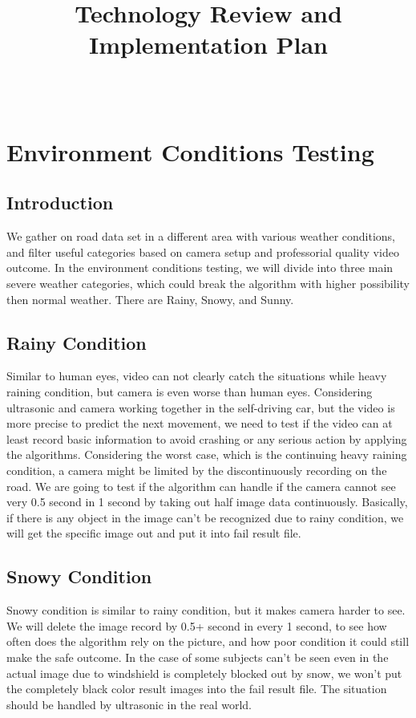\documentclass[10pt,draftclsnofoot,onecolumn,journal,compsoc]{IEEEtran}
\title{Technology Review and Implementation Plan}
\author{
  \IEEEauthorblockN{Team (Group 32) name: Teaching AutoPilot to Dodge\\ Author: Xilun Guo\\Team members: Basil Al Zamil and Tanner Fry} \\
  \IEEEauthorblockA{CS 461: Senior Capstone Fall 2016 \\ Oregon State University}
}
\date{}
\begin{document}
\maketitle
\IEEEdisplaynontitleabstractindextext
\IEEEpeerreviewmaketitle

\newpage

\tableofcontents

\newpage

\section{Environment Conditions Testing}
\subsection{Introduction}
We gather on road data set in a different area with various weather conditions, and filter useful categories based on camera setup and professorial quality video outcome. 
In the environment conditions testing, we will divide into three main severe weather categories, which could break the algorithm with higher possibility then normal weather. 
There are Rainy, Snowy, and Sunny.

\subsection{Rainy Condition}
Similar to human eyes, video can not clearly catch the situations while heavy raining condition, but camera is even worse than human eyes. 
Considering ultrasonic and camera working together in the self-driving car, but the video is more precise to predict the next movement, we need to test if the video can at least record basic information to avoid crashing or any serious action by applying the algorithms. 
Considering the worst case, which is the continuing heavy raining condition, a camera might be limited by the discontinuously recording on the road. 
We are going to test if the algorithm can handle if the camera cannot see very 0.5 second in 1 second by taking out half image data continuously.    
Basically, if there is any object in the image can't be recognized due to rainy condition, we will get the specific image out and put it into fail result file.

\subsection{Snowy Condition}
Snowy condition is similar to rainy condition, but it makes camera harder to see.  We will delete the image record by 0.5+ second in every 1 second, to see how often does the algorithm rely on the picture, and how poor condition it could still make the safe outcome.
In the case of some subjects can't be seen even in the actual image due to windshield is completely blocked out by snow, we won't put the completely black color result images into the fail result file.
The situation should be handled by ultrasonic in the real world. 
\end{document}
